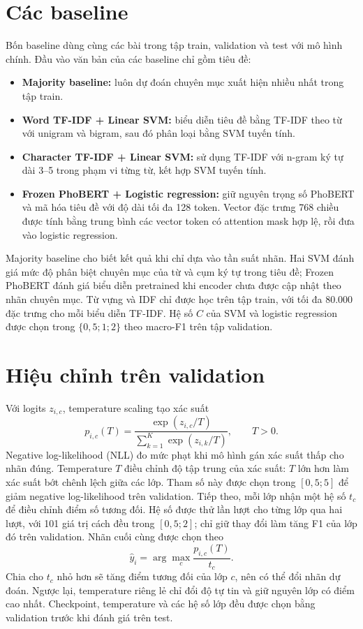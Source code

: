 \section{Các baseline}
Bốn baseline dùng cùng các bài trong tập train, validation và test với mô hình chính. Đầu vào văn bản của các baseline chỉ gồm tiêu đề:
\begin{itemize}
\item \textbf{Majority baseline:} luôn dự đoán chuyên mục xuất hiện nhiều nhất trong tập train.
\item \textbf{Word TF-IDF + Linear SVM:} biểu diễn tiêu đề bằng TF-IDF theo từ với unigram và bigram, sau đó phân loại bằng SVM tuyến tính.
\item \textbf{Character TF-IDF + Linear SVM:} sử dụng TF-IDF với n-gram ký tự dài 3--5 trong phạm vi từng từ, kết hợp SVM tuyến tính.
\item \textbf{Frozen PhoBERT + Logistic regression:} giữ nguyên trọng số PhoBERT và mã hóa tiêu đề với độ dài tối đa 128 token. Vector đặc trưng 768 chiều được tính bằng trung bình các vector token có attention mask hợp lệ, rồi đưa vào logistic regression.
\end{itemize}

Majority baseline cho biết kết quả khi chỉ dựa vào tần suất nhãn. Hai SVM đánh giá mức độ phân biệt chuyên mục của từ và cụm ký tự trong tiêu đề; Frozen PhoBERT đánh giá biểu diễn pretrained khi encoder chưa được cập nhật theo nhãn chuyên mục. Từ vựng và IDF chỉ được học trên tập train, với tối đa 80.000 đặc trưng cho mỗi biểu diễn TF-IDF. Hệ số $C$ của SVM và logistic regression được chọn trong $\{0{,}5;1;2\}$ theo macro-F1 trên tập validation.

\section{Hiệu chỉnh trên validation}
Với logits $z_{i,c}$, temperature scaling tạo xác suất
\[
p_{i,c}(T)=\frac{\exp(z_{i,c}/T)}{\sum_{k=1}^{K}\exp(z_{i,k}/T)},\qquad T>0.
\]
Negative log-likelihood (NLL) đo mức phạt khi mô hình gán xác suất thấp cho nhãn đúng. Temperature $T$ điều chỉnh độ tập trung của xác suất: $T$ lớn hơn làm xác suất bớt chênh lệch giữa các lớp. Tham số này được chọn trong $[0{,}5;5]$ để giảm negative log-likelihood trên validation. Tiếp theo, mỗi lớp nhận một hệ số $t_c$ để điều chỉnh điểm số tương đối. Hệ số được thử lần lượt cho từng lớp qua hai lượt, với 101 giá trị cách đều trong $[0{,}5;2]$; chỉ giữ thay đổi làm tăng F1 của lớp đó trên validation. Nhãn cuối cùng được chọn theo
\[
\widehat y_i=\arg\max_c\frac{p_{i,c}(T)}{t_c}.
\]
Chia cho $t_c$ nhỏ hơn sẽ tăng điểm tương đối của lớp $c$, nên có thể đổi nhãn dự đoán. Ngược lại, temperature riêng lẻ chỉ đổi độ tự tin và giữ nguyên lớp có điểm cao nhất. Checkpoint, temperature và các hệ số lớp đều được chọn bằng validation trước khi đánh giá trên test.

